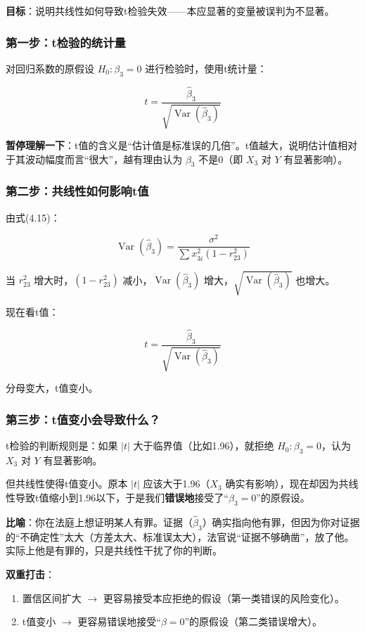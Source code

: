 \documentclass[12pt,a4paper]{ctexart}
\newcommand{\Var}{\operatorname{Var}}
\begin{document}
\textbf{目标}：说明共线性如何导致t检验失效——本应显著的变量被误判为不显著。

\subsubsection{第一步：t检验的统计量}

对回归系数的原假设 $H_0: \beta_3 = 0$ 进行检验时，使用t统计量：

\[
t = \frac{\hat{\beta}_3}{\sqrt{\Var(\hat{\beta}_3)}}
\]

\textbf{暂停理解一下}：t值的含义是“估计值是标准误的几倍”。t值越大，说明估计值相对于其波动幅度而言“很大”，越有理由认为 $\beta_3$ 不是0（即 $X_3$ 对 $Y$ 有显著影响）。

\subsubsection{第二步：共线性如何影响t值}

由式(4.15)：

\[
\Var(\hat{\beta}_3) = \frac{\sigma^2}{\sum x_{3i}^2 (1 - r_{23}^2)}
\]

当 $r_{23}^2$ 增大时，$(1-r_{23}^2)$ 减小，$\Var(\hat{\beta}_3)$ 增大，$\sqrt{\Var(\hat{\beta}_3)}$ 也增大。

现在看t值：

\[
t = \frac{\hat{\beta}_3}{\sqrt{\Var(\hat{\beta}_3)}}
\]

分母变大，t值变小。

\subsubsection{第三步：t值变小会导致什么？}

t检验的判断规则是：如果 $|t|$ 大于临界值（比如1.96），就拒绝 $H_0: \beta_3 = 0$，认为 $X_3$ 对 $Y$ 有显著影响。

但共线性使得t值变小。原本 $|t|$ 应该大于1.96（$X_3$ 确实有影响），现在却因为共线性导致t值缩小到1.96以下，于是我们\textbf{错误地}接受了“$\beta_3 = 0$”的原假设。

\textbf{比喻}：你在法庭上想证明某人有罪。证据（$\hat{\beta}_3$）确实指向他有罪，但因为你对证据的“不确定性”太大（方差太大、标准误太大），法官说“证据不够确凿”，放了他。实际上他是有罪的，只是共线性干扰了你的判断。

\textbf{双重打击}：
\begin{enumerate}
    \item 置信区间扩大 $\to$ 更容易接受本应拒绝的假设（第一类错误的风险变化）。
    \item t值变小 $\to$ 更容易错误地接受“$\beta = 0$”的原假设（第二类错误增大）。
\end{enumerate}
\end{document}
